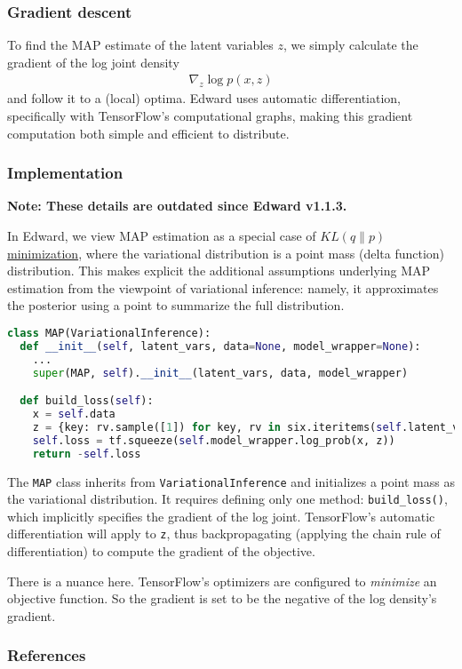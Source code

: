 \subsubsection{Gradient descent}

To find the MAP estimate of the latent variables $z$, we simply
calculate the gradient of the log joint density
\begin{align*}
  \nabla_z
  \log p(x, z)
\end{align*}
and follow it to a (local) optima.
Edward uses automatic differentiation, specifically with TensorFlow's
computational graphs, making this gradient computation both simple and
efficient to distribute.

\subsubsection{Implementation}

\textbf{Note: These details are outdated since Edward v1.1.3.}

In Edward, we view MAP estimation as a special case of
\href{/tutorials/klqp}{$KL(q\|p)$ minimization}, where the variational
distribution is a point mass (delta function) distribution. This makes
explicit the additional assumptions underlying MAP estimation from the
viewpoint of variational inference: namely, it approximates the
posterior using a point to summarize the full distribution.

\begin{lstlisting}[language=Python]
class MAP(VariationalInference):
  def __init__(self, latent_vars, data=None, model_wrapper=None):
    ...
    super(MAP, self).__init__(latent_vars, data, model_wrapper)

  def build_loss(self):
    x = self.data
    z = {key: rv.sample([1]) for key, rv in six.iteritems(self.latent_vars)}
    self.loss = tf.squeeze(self.model_wrapper.log_prob(x, z))
    return -self.loss
\end{lstlisting}

The \texttt{MAP} class inherits from \texttt{VariationalInference} and
initializes a point mass as the variational distribution. It requires
defining only one method:
\texttt{build_loss()}, which implicitly specifies the gradient of the
log joint. TensorFlow's automatic differentiation will apply to
\texttt {z}, thus backpropagating (applying the chain rule of
differentiation) to compute the gradient of the objective.

There is a nuance here. TensorFlow's optimizers are configured to
\emph{minimize} an objective function. So the gradient is set to be
the negative of the log density's gradient.

\subsubsection{References}\label{references}
